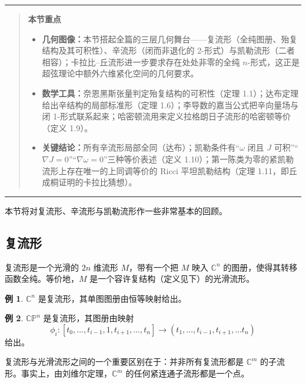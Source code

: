 \documentclass[11pt,a4paper]{article}
\theoremstyle{plain}
\theoremstyle{definition}
\newtheorem*{example}{例}
\newenvironment{keytakeaways}[1][本节重点]{%
  \par\addvspace{9pt}%
  \noindent\rule{\linewidth}{0.7pt}\par\nobreak
  \begin{quote}\noindent\textbf{#1}\par\small
}{%
  \end{quote}%
  \noindent\rule{\linewidth}{0.7pt}\par\addvspace{7pt}%
}
\begin{document}
\begin{keytakeaways}
\begin{itemize}[leftmargin=1.6em,itemsep=1pt,topsep=2pt]
  \item \textbf{几何图像：}本节搭起全篇的三层几何舞台——复流形（全纯图册、殆复结构及其可积性）、辛流形（闭而非退化的 2-形式）与凯勒流形（二者相容）；卡拉比–丘流形进一步要求存在处处非零的全纯 $n$-形式，这正是超弦理论中额外六维紧化空间的几何要求。
  \item \textbf{数学工具：}奈恩黑斯张量判定殆复结构的可积性（定理 1.1）；达布定理给出辛结构的局部标准形（定理 1.6）；李导数的嘉当公式把辛向量场与闭 1-形式联系起来；哈密顿流用来定义拉格朗日子流形的哈密顿等价（定义 1.9）。
  \item \textbf{关键结论：}所有辛流形局部全同（达布）；凯勒条件有“$\omega$ 闭且 $J$ 可积”“$\nabla J=0$”“$\nabla\omega=0$”三种等价表述（定义 1.10）；第一陈类为零的紧凯勒流形上存在唯一的上同调等价的 Ricci 平坦凯勒结构（定理 1.11，即丘成桐证明的卡拉比猜想）。
\end{itemize}
\end{keytakeaways}

本节将对复流形、辛流形与凯勒流形作一些非常基本的回顾。

\subsection{复流形}

复流形是一个光滑的 $2n$ 维流形 $M$，带有一个把 $M$ 映入 $\mathbb{C}^n$ 的图册，使得其转移函数全纯。等价地，$M$ 是一个容许复结构（定义见下）的光滑流形。

\begin{example}
$\mathbb{C}^n$ 是复流形，其单图图册由恒等映射给出。
\end{example}

\begin{example}
$\mathbb{CP}^n$ 是复流形，其图册由映射
\[
\phi_i\colon [t_0,\ldots,t_{i-1},1,t_{i+1},\ldots,t_n]\to (t_1,\ldots,t_{i-1},t_{i+1},\ldots t_n)
\]
给出。
\end{example}


复流形与光滑流形之间的一个重要区别在于：并非所有复流形都是 $\mathbb{C}^m$ 的子流形。事实上，由刘维尔定理，$\mathbb{C}^m$ 的任何紧连通子流形都是一个点。
\end{document}
